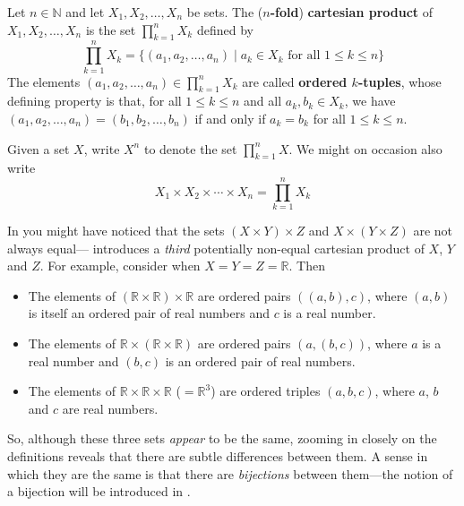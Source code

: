 \begin{definition}
\label{defCartesianProductNFold}
Let $n \in \mathbb{N}$ and let $X_1, X_2, \dots, X_n$ be sets. The (\textbf{$n$-fold}) \textbf{cartesian product} of $X_1, X_2, \dots, X_n$ is the set $\prod_{k=1}^n X_k$  defined by
\[ \prod_{k=1}^n X_k = \{ (a_1, a_2, \dots, a_n) \mid a_k \in X_k \text{ for all } 1 \le k \le n \} \]
The elements $(a_1, a_2, \dots, a_n) \in \prod_{k=1}^n X_k$ are called \textbf{ordered $k$-tuples}, whose defining property is that, for all $1 \le k \le n$ and all $a_k,b_k \in X_k$, we have $(a_1, a_2, \dots, a_n) = (b_1, b_2, \dots, b_n)$ if and only if $a_k = b_k$ for all $1 \le k \le n$.

Given a set $X$, write $X^n$ to denote the set $\prod_{k=1}^n X$. We might on occasion also write
\[ X_1 \times X_2 \times \cdots \times X_n = \prod_{k=1}^n X_k \]
\end{definition}

\begin{example}
In  you might have noticed that the sets $(X \times Y) \times Z$ and $X \times (Y \times Z)$ are not always equal--- introduces a \textit{third} potentially non-equal cartesian product of $X$, $Y$ and $Z$. For example, consider when $X=Y=Z=\mathbb{R}$. Then
\begin{itemize}
\item The elements of $(\mathbb{R} \times \mathbb{R}) \times \mathbb{R}$ are ordered pairs $((a,b),c)$, where $(a,b)$ is itself an ordered pair of real numbers and $c$ is a real number.
\item The elements of $\mathbb{R} \times (\mathbb{R} \times \mathbb{R})$ are ordered pairs $(a,(b,c))$, where $a$ is a real number and $(b,c)$ is an ordered pair of real numbers.
\item The elements of $\mathbb{R} \times \mathbb{R} \times \mathbb{R}$ ($=\mathbb{R}^3$) are ordered triples $(a,b,c)$, where $a$, $b$ and $c$ are real numbers.
\end{itemize}
So, although these three sets \textit{appear} to be the same, zooming in closely on the definitions reveals that there are subtle differences between them. A sense in which they are the same is that there are \textit{bijections} between them---the notion of a bijection will be introduced in .
\end{example}

